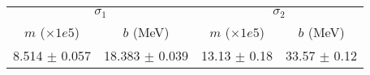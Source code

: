 \begin{tabular}{cc|cc}
\multicolumn{2}{c|}{$\sigma_1$} & \multicolumn{2}{|c}{$\sigma_2$} \\
$m$ ($\times1e5$) & $b$ (MeV) & $m$ ($\times1e5$) & $b$ (MeV) \\
\hline
8.514 $\pm$ 0.057 & 18.383 $\pm$ 0.039 & 13.13 $\pm$ 0.18 & 33.57 $\pm$ 0.12\\
\end{tabular}
